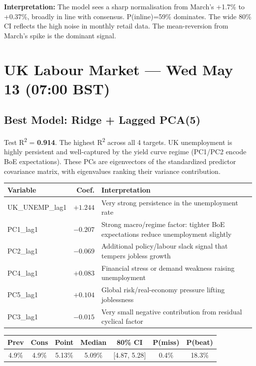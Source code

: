 \documentclass[11pt,a4paper]{article}
\begin{document}
\noindent\textbf{Interpretation:} The model sees a sharp normalisation from March's +1.7\% to +0.37\%, broadly in line with consensus. P(inline)=59\% dominates. The wide 80\% CI reflects the high noise in monthly retail data. The mean-reversion from March's spike is the dominant signal.

\newpage

\section*{UK Labour Market --- Wed May 13 (07:00 BST)}

\subsection*{Best Model: Ridge + Lagged PCA(5)}
Test R\textsuperscript{2} = \textbf{0.914}. The highest R\textsuperscript{2} across all 4 targets. UK unemployment is highly persistent and well-captured by the yield curve regime (PC1/PC2 encode BoE expectations). These PCs are eigenvectors of the standardized predictor covariance matrix, with eigenvalues ranking their variance contribution.

\begin{table}[H]
\centering\small
\begin{tabular}{lrl}
\toprule
\textbf{Variable} & \textbf{Coef.} & \textbf{Interpretation} \\
\midrule
UK\_UNEMP\_lag1 & $+1.244$ & Very strong persistence in the unemployment rate \\
PC1\_lag1 & $-0.207$ & Strong macro/regime factor: tighter BoE expectations reduce unemployment slightly \\
PC2\_lag1 & $-0.069$ & Additional policy/labour slack signal that tempers jobless growth \\
PC4\_lag1 & $+0.083$ & Financial stress or demand weakness raising unemployment \\
PC5\_lag1 & $+0.104$ & Global risk/real-economy pressure lifting joblessness \\
PC3\_lag1 & $-0.015$ & Very small negative contribution from residual cyclical factor \\
\bottomrule
\end{tabular}
\end{table}

\begin{table}[H]
\centering\small
\begin{tabular}{ccccccc}
\toprule
\textbf{Prev} & \textbf{Cons} & \textbf{Point} & \textbf{Median} & \textbf{80\% CI} & \textbf{P(miss)} & \textbf{P(beat)} \\
\midrule
4.9\% & 4.9\% & 5.13\% & 5.09\% & [4.87, 5.28] & 0.4\% & 18.3\% \\
\bottomrule
\end{tabular}
\end{table}
\end{document}
